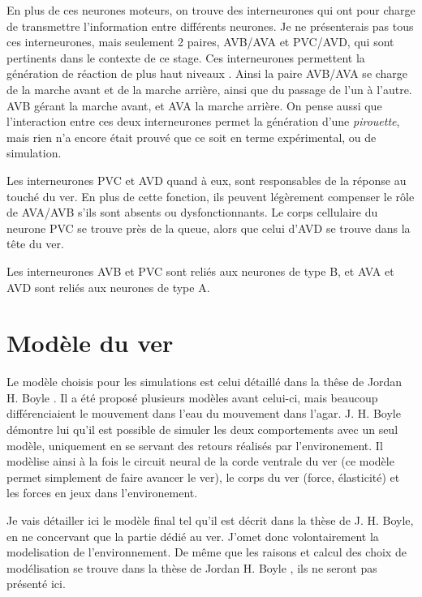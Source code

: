 En plus de ces neurones moteurs, on trouve des interneurones qui ont pour
charge de transmettre l'information entre différents neurones. Je ne
présenterais pas tous ces interneurones, mais seulement 2 paires, AVB/AVA et
PVC/AVD, qui sont pertinents dans le contexte de ce stage. Ces interneurones
permettent la génération de réaction de plus haut niveaux
\cite{Boyle2009,White1986}.  Ainsi la paire AVB/AVA se charge de la marche
avant et de la marche arrière, ainsi que du passage de l'un à l'autre. AVB gérant
la marche avant, et AVA la marche arrière. On pense aussi que l'interaction
entre ces deux interneurones permet la génération d'une \textit{pirouette},
mais rien n'a encore était prouvé que ce soit en terme expérimental, ou de
simulation.

Les interneurones PVC et AVD quand à eux, sont responsables de la réponse au
touché du ver. En plus de cette fonction, ils peuvent légèrement compenser le
rôle de AVA/AVB s'ils sont absents ou dysfonctionnants.  Le corps cellulaire du
neurone PVC se trouve près de la queue, alors que celui d'AVD se trouve dans la
tête du ver.

Les interneurones AVB et PVC sont reliés aux neurones de type B, et AVA et AVD
sont reliés aux neurones de type A.




\section{Modèle du ver} %
\label{sec:Modèle du ver}

Le modèle choisis pour les simulations est celui détaillé dans la thêse de
Jordan H. Boyle \cite{Boyle2009}. Il a été proposé plusieurs modèles avant
celui-ci, mais beaucoup différenciaient le mouvement dans l'eau du mouvement
dans l'agar. J. H. Boyle démontre lui qu'il est possible de simuler les deux
comportements avec un seul modèle, uniquement en se servant des retours
réalisés par l'environement. Il modèlise ainsi à la fois le circuit neural de
la corde ventrale du ver (ce modèle permet simplement de faire avancer le ver),
le corps du ver (force, élasticité) et les forces en jeux dans l'environement.

Je vais détailler ici le modèle final tel qu'il est décrit dans la thèse de J.
H. Boyle, en ne concervant que la partie dédié au ver. J'omet donc
volontairement la modelisation de l'environnement. De même que les raisons et
calcul des choix de modélisation se trouve dans la thèse de Jordan H. Boyle
\cite{Boyle2009}, ils ne seront pas présenté ici.\\

